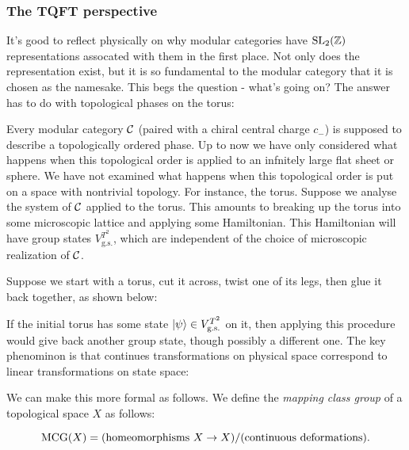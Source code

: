 \begin{ex}
\end{ex}

\subsubsection{The TQFT perspective}


It's good to reflect physically on why modular categories have $\operatorname{SL}_2({\mathbb Z})$ representations assocated with them in the first place. Not only does the representation exist, but it is so fundamental to the modular category that it is chosen as the namesake. This begs the question - what's going on? The answer has to do with topological phases on the torus:


Every modular category ${\mathcal C}$ (paired with a chiral central charge $c_-$) is supposed to describe a topologically ordered phase. Up to now we have only considered what happens when this topological order is applied to an infnitely large flat sheet or sphere. We have not examined what happens when this topological order is put on a space with nontrivial topology. For instance, the torus. Suppose we analyse the system of ${\mathcal C}$ applied to the torus. This amounts to breaking up the torus into some microscopic lattice and applying some Hamiltonian. This Hamiltonian will have group states $V_{\text{g.s.}}^{T^2}$, which are independent of the choice of microscopic realization of ${\mathcal C}$.

Suppose we start with a torus, cut it across, twist one of its legs, then glue it back together, as shown below:


If the initial torus has some state $\ket{\psi}\in V_{\text{g.s.}}^{T^2}$ on it, then applying this procedure would give back another group state, though possibly a different one. The key phenominon is that continues transformations on physical space correspond to linear transformations on state space:


We can make this more formal as follows. We define the {\em mapping class group} of a topological space $X$ as follows:

$$\operatorname{MCG}(X)=(\text{homeomorphisms $X\to X$})/(\text{continuous deformations}).$$

